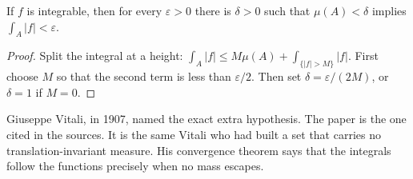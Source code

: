 \begin{lemma}\label{lem:abscont}
If \(f\) is integrable, then for every \(\varepsilon>0\) there is \(\delta>0\) such that \(\mu(A)<\delta\) implies \(\int_A|f|<\varepsilon\).
\end{lemma}
\begin{proof}
Split the integral at a height: \(\int_A|f|\le M\mu(A)+\int_{\{|f|>M\}}|f|\). First choose \(M\) so that the second term is less than \(\varepsilon/2\). Then set \(\delta=\varepsilon/(2M)\), or \(\delta=1\) if \(M=0\).
\end{proof}

Giuseppe Vitali, in 1907, named the exact extra hypothesis. The paper is the one cited in the sources. It is the same Vitali who had built a set that carries no translation-invariant measure. His convergence theorem says that the integrals follow the functions precisely when no mass escapes.

